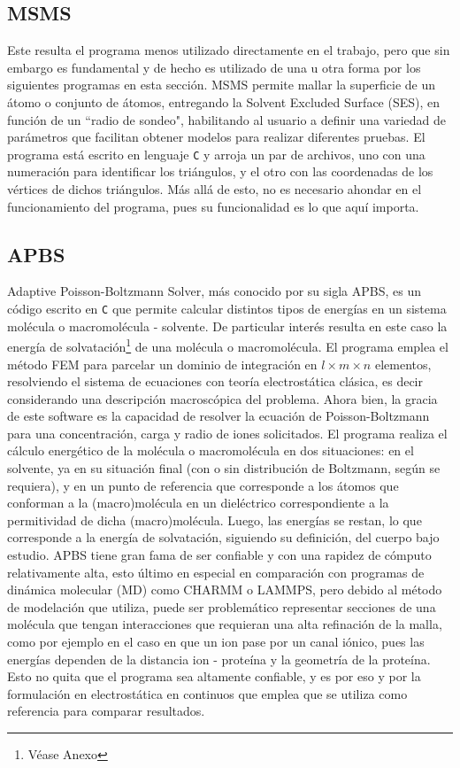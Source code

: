 \documentclass[12pt, oneside, numbers, spanish]{ezthesis}
\numberwithin{equation}{section}
\begin{document}
\subsection{MSMS}\label{subsec:MSMS}
Este resulta el programa menos utilizado directamente en el trabajo, pero que sin embargo es fundamental y de hecho es utilizado de una u otra forma por los siguientes programas en esta sección. MSMS permite mallar la superficie de un átomo o conjunto de átomos, entregando la Solvent Excluded Surface (SES), en función de un ``radio de sondeo", habilitando al usuario a definir una variedad de parámetros que facilitan obtener modelos para realizar diferentes pruebas. El programa está escrito en lenguaje \texttt{C} y arroja un par de archivos, uno con una numeración para identificar los triángulos, y el otro con las coordenadas de los vértices de dichos triángulos. Más allá de esto, no es necesario ahondar en el funcionamiento del programa, pues su funcionalidad es lo que aquí importa.

\subsection{APBS}\label{subsec:APBS}
Adaptive Poisson-Boltzmann Solver, más conocido por su sigla APBS, es un código escrito en \texttt{C} que permite calcular distintos tipos de energías en un sistema molécula o macromolécula - solvente. De particular interés resulta en este caso la energía de solvatación\footnote{Véase Anexo} de una molécula o macromolécula. El programa emplea el método FEM para parcelar un dominio de integración en $l\times m\times n$ elementos, resolviendo el sistema de ecuaciones con teoría electrostática clásica, es decir considerando una descripción macroscópica del problema. Ahora bien, la gracia de este software es la capacidad de resolver la ecuación de Poisson-Boltzmann para una concentración, carga y radio de iones solicitados. El programa realiza el cálculo energético de la molécula o macromolécula en dos situaciones: en el solvente, ya en su situación final (con o sin distribución de Boltzmann, según se requiera), y en un punto de referencia que corresponde a los átomos que conforman a la (macro)molécula en un dieléctrico correspondiente a la permitividad de dicha (macro)molécula. Luego, las energías se restan, lo que corresponde a la energía de solvatación, siguiendo su definición, del cuerpo bajo estudio. APBS tiene gran fama de ser confiable y con una rapidez de cómputo relativamente alta, esto último en especial en comparación con programas de dinámica molecular (MD) como CHARMM o LAMMPS, pero debido al método de modelación que utiliza, puede ser problemático representar secciones de una molécula que tengan interacciones que requieran una alta refinación de la malla, como por ejemplo en el caso en que un ion pase por un canal iónico, pues las energías dependen de la distancia ion - proteína y la geometría de la proteína. Esto no quita que el programa sea altamente confiable, y es por eso y por la formulación en electrostática en continuos que emplea que se utiliza como referencia para comparar resultados.
\end{document}
